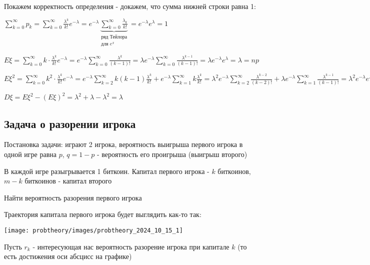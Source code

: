 \documentclass[12pt]{article}
\begin{document}
    \smallvspace

    Покажем корректность определения - докажем, что сумма нижней строки равна 1:

    $\sum_{k = 0}^\infty p_k = \sum_{k = 0}^\infty \frac{\lambda^k}{k!} e^{-\lambda} = e^{-\lambda} \underset{\substack{\text{ряд Тейлора}\\ \text{для } e^x}}{\underbrace{\sum_{k = 0}^\infty \frac{\lambda_k}{k!}}} = e^{-\lambda} e^\lambda = 1$

    $E\xi = \sum_{k = 0}^\infty k \cdot \frac{\lambda^k}{k!}e^{-\lambda} = e^{-\lambda} \sum_{k = 0}^\infty \frac{\lambda^k}{(k - 1)!} = 
    \lambda e^{-\lambda} \sum_{k = 0}^\infty \frac{\lambda^{k - 1}}{(k - 1)!} = \lambda e^{-\lambda} e^\lambda = \lambda = np$

    
    $E\xi^2 = \sum_{k = 0}^\infty k^2 \cdot \frac{\lambda^k}{k!}e^{-\lambda} = e^{-\lambda} \sum_{k = 2}^\infty k(k - 1) \frac{\lambda^k}{k!} + 
    e^{-\lambda} \sum_{k = 1}^\infty k \frac{\lambda^k}{k!} = \lambda^2 e^{-\lambda} \sum_{k = 2}^\infty \frac{\lambda^{k - 2}}{(k - 2)!} + 
    \lambda e^{-\lambda} \sum_{k = 1}^\infty \frac{\lambda^{k - 1}}{(k - 1)!} = \lambda^2 e^{-\lambda} e^\lambda + \lambda e^{-\lambda} e^\lambda = \lambda^2 + \lambda$

    $D\xi = E\xi^2 - (E\xi)^2 = \lambda^2 + \lambda - \lambda^2 = \lambda$

    \clearpage

    \subsection{Задача о разорении игрока}

    Постановка задачи: играют 2 игрока, вероятность выигрыша первого игрока в одной игре равна $p$, $q = 1 - p$ - вероятность его проигрыша (выигрыш второго)

    В каждой игре разыгрывается 1 биткоин. Капитал первого игрока - $k$ биткоинов, $m - k$ биткоинов - капитал второго

    Найти вероятность разорения первого игрока

    Траектория капитала первого игрока будет выглядить как-то так:

    \begin{center}
        \texttt{[image: probtheory/images/probtheory\_2024\_10\_15\_1]}
    \end{center}

    Пусть $r_k$ - интересующая нас вероятность разорение игрока при капитале $k$ (то есть достижения оси абсцисс на графике)
\end{document}

